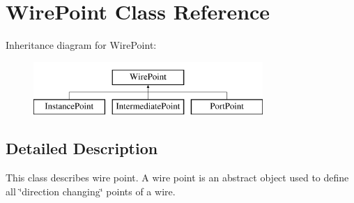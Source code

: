 \hypertarget{class_open_chams_1_1_wire_point}{}\section{Wire\+Point Class Reference}
\label{class_open_chams_1_1_wire_point}
Inheritance diagram for Wire\+Point\+:\begin{figure}[H]
\begin{center}
\leavevmode
\includegraphics[height=2.000000cm]{class_open_chams_1_1_wire_point}
\end{center}
\end{figure}


\subsection{Detailed Description}
This class describes wire point. A wire point is an abstract object used to define all \char`\"{}direction changing\char`\"{} points of a wire. 